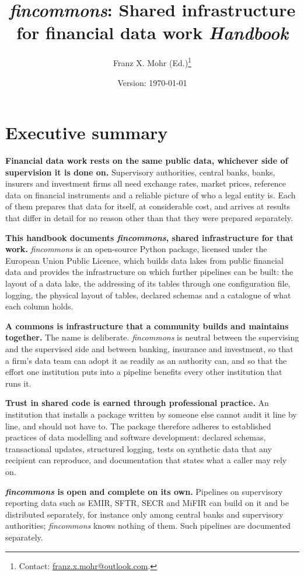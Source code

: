 \documentclass[a4paper, 11pt]{report}
\title{\emph{fincommons}: Shared infrastructure for financial data work\vskip 1cm \textit{Handbook}\vskip 1cm}
\author{Franz X. Mohr (Ed.)\thanks{Contact: \href{mailto:franz.x.mohr@outlook.com}{franz.x.mohr@outlook.com}.}}%
\date{Version: \today}
\begin{document}
\maketitle

\section*{Executive summary}

\textbf{Financial data work rests on the same public data, whichever side of supervision it is done on.} Supervisory authorities, central banks, banks, insurers and investment firms all need exchange rates, market prices, reference data on financial instruments and a reliable picture of who a legal entity is. Each of them prepares that data for itself, at considerable cost, and arrives at results that differ in detail for no reason other than that they were prepared separately.

\textbf{This handbook documents \emph{fincommons}, shared infrastructure for that work.} \emph{fincommons} is an open-source Python package, licensed under the European Union Public Licence, which builds data lakes from public financial data and provides the infrastructure on which further pipelines can be built: the layout of a data lake, the addressing of its tables through one configuration file, logging, the physical layout of tables, declared schemas and a catalogue of what each column holds.

\textbf{A commons is infrastructure that a community builds and maintains together.} The name is deliberate. \emph{fincommons} is neutral between the supervising and the supervised side and between banking, insurance and investment, so that a firm's data team can adopt it as readily as an authority can, and so that the effort one institution puts into a pipeline benefits every other institution that runs it.

\textbf{Trust in shared code is earned through professional practice.} An institution that installs a package written by someone else cannot audit it line by line, and should not have to. The package therefore adheres to established practices of data modelling and software development: declared schemas, transactional updates, structured logging, tests on synthetic data that any recipient can reproduce, and documentation that states what a caller may rely on.

\textbf{\emph{fincommons} is open and complete on its own.} Pipelines on supervisory reporting data such as EMIR, SFTR, SECR and MiFIR can build on it and be distributed separately, for instance only among central banks and supervisory authorities; \emph{fincommons} knows nothing of them. Such pipelines are documented separately.
\end{document}
